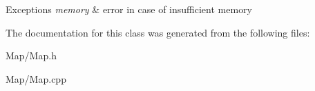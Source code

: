 \begin{DoxyExceptions}{Exceptions}
{\em memory} & error in case of insufficient memory \\
\hline
\end{DoxyExceptions}


The documentation for this class was generated from the following files\+:\begin{DoxyCompactItemize}
\item 
Map/Map.\+h\item 
Map/Map.\+cpp\end{DoxyCompactItemize}
